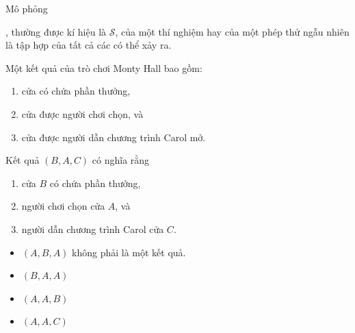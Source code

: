 \begin{frame}{Mô phỏng}
  \href{open /data/Dropbox/Teaching/BachKhoa/Courses/ToanChuyenDe2015/simulation/MontyHall.java}{}
\end{frame}
\begin{frame}
  \begin{dfntn}
     , thường được kí hiệu là $\mathcal{S}$, của một thí nghiệm hay của một phép thử ngẫu nhiên là tập hợp của tất cả các  có thể xảy ra. 
  \end{dfntn}

  \begin{xmpl}
    Một kết quả của trò chơi Monty Hall bao gồm:
    \begin{enumerate}
    \item cửa có chứa phần thưởng,
    \item cửa được người chơi chọn, và
    \item cửa được người dẫn chương trình Carol mở.
    \end{enumerate}
  \end{xmpl}
\end{frame}

\begin{frame}
  \begin{xmpl}
    Kết quả $(B, A, C)$ có nghĩa rằng 
    \begin{enumerate}
    \item cửa $B$ có chứa phần thưởng,
    \item người chơi chọn cửa $A$, và
    \item người dẫn chương trình Carol cửa $C$.
    \end{enumerate}
  \end{xmpl}
\end{frame}

\begin{frame}
  \begin{xmpl}
    \begin{itemize}
    \item $(A,B,A)$ không phải là một kết quả.
    \item $(B,A,A)$
    \item $(A,A,B)$
    \item $(A,A,C)$
    \end{itemize}
  \end{xmpl}
\end{frame}

